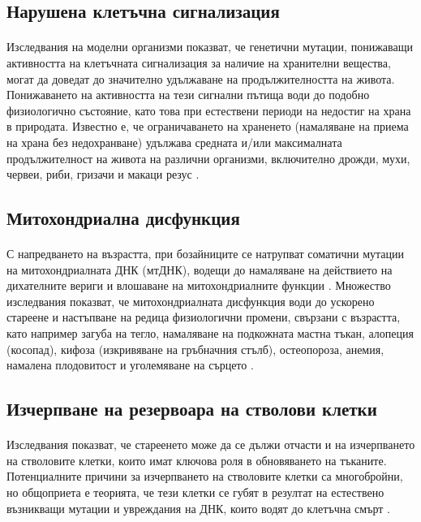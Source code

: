 \documentclass[pdftex,cyrillic,14pt,a4page,twoside,openright]{extreport}
\begin{document}
\subsection{Нарушена клетъчна сигнализация}
\paragraph{}
Изследвания на моделни организми показват, че генетични мутации, понижаващи активността на клетъчната сигнализация за наличие на хранителни вещества, могат да доведат до значително удължаване на продължителността на живота. Понижаването на активността на тези сигнални пътища води до подобно физиологично състояние, като това при естествени периоди на недостиг на храна в природата. Известно е, че ограничаването на храненето (намаляване на приема на храна без недохранване) удължава средната и/или максималната продължителност на живота на различни организми, включително дрожди, мухи, червеи, риби, гризачи и макаци резус \cite{fontana2010}.

\subsection{Митохондриална дисфункция}
\paragraph{}
С напредването на възрастта, при бозайниците се натрупват соматични мутации на митохондриалната ДНК (мтДНК), водещи до намаляване на действието на дихателните вериги и влошаване на митохондриалните функции \cite{trifunovic2008}. Множество изследвания \cite{kujoth2005, vermulst2008} показват, че митохондриалната дисфункция води до ускорено стареене и настъпване на редица физиологични промени, свързани с възрастта, като например загуба на тегло, намаляване на подкожната мастна тъкан, алопеция (косопад), кифоза (изкривяване на гръбначния стълб), остеопороза, анемия, намалена плодовитост и уголемяване на сърцето \cite{trifunovic2008}.

\subsection{Изчерпване на резервоара на стволови клетки}
\paragraph{}
Изследвания показват, че стареенето може да се дължи отчасти и на изчерпването на стволовите клетки, които имат ключова роля в обновяването на тъканите. Потенциалните причини за изчерпването на стволовите клетки са многобройни, но общоприета е теорията, че тези клетки се губят в резултат на естествено възникващи мутации и увреждания на ДНК, които водят до клетъчна смърт \cite{ruzankina2007, revuelta2017}.
\end{document}
